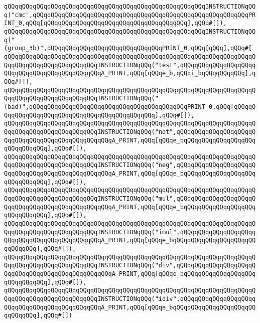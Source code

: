 \verb|qQQqqQQqqQQqqQQqqQQqqQQqqQQqqQQqqQQqqQQqqQQqqQQqqQQqqQQqINSTRUCTIONqQQq("cmc",qQQqqQQqqQQqqQQqqQQqqQQqqQQqqQQqqQQqqQQqqQQqqQQqqQQqqQQqqQQqPRINT_0,qQQq[qQQqqQQqqQQqqQQqqQQqqQQqqQQqqQQqqQQqqQQq],qQQq#[]),|\newline
\verb|qQQqqQQqqQQqqQQqqQQqqQQqqQQqqQQqqQQqqQQqqQQqqQQqqQQqqQQqINSTRUCTIONqQQq("(group_3b)",qQQqqQQqqQQqqQQqqQQqqQQqqQQqqQQqPRINT_0,qQQq[qQQq],qQQq#[|\newline
\verb|qQQqqQQqqQQqqQQqqQQqqQQqqQQqqQQqqQQqqQQqqQQqqQQqqQQqqQQqqQQqqQQqqQQqqQQqqQQqqQQqqQQqqQQqqQQqqQQqINSTRUCTIONqQQq("test",qQQqqQQqqQQqqQQqqQQqqQQqqQQqqQQqqQQqqQQqqQQqqQQqA_PRINT,qQQq[qQQqe_b,qQQqi_bqQQqqQQqqQQq],qQQq#[]),|\newline
\verb|qQQqqQQqqQQqqQQqqQQqqQQqqQQqqQQqqQQqqQQqqQQqqQQqqQQqqQQqqQQqqQQqqQQqqQQqqQQqqQQqqQQqqQQqqQQqqQQqINSTRUCTIONqQQq("(bad)",qQQqqQQqqQQqqQQqqQQqqQQqqQQqqQQqqQQqqQQqqQQqPRINT_0,qQQq[qQQqqQQqqQQqqQQqqQQqqQQqqQQqqQQqqQQqqQQqqQQqqQQq],qQQq#[]),|\newline
\verb|qQQqqQQqqQQqqQQqqQQqqQQqqQQqqQQqqQQqqQQqqQQqqQQqqQQqqQQqqQQqqQQqqQQqqQQqqQQqqQQqqQQqqQQqqQQqqQQqINSTRUCTIONqQQq("not",qQQqqQQqqQQqqQQqqQQqqQQqqQQqqQQqqQQqqQQqqQQqqQQqqQQqA_PRINT,qQQq[qQQqe_bqQQqqQQqqQQqqQQqqQQqqQQqqQQqqQQq],qQQq#[]),|\newline
\verb|qQQqqQQqqQQqqQQqqQQqqQQqqQQqqQQqqQQqqQQqqQQqqQQqqQQqqQQqqQQqqQQqqQQqqQQqqQQqqQQqqQQqqQQqqQQqqQQqINSTRUCTIONqQQq("neg",qQQqqQQqqQQqqQQqqQQqqQQqqQQqqQQqqQQqqQQqqQQqqQQqqQQqA_PRINT,qQQq[qQQqe_bqQQqqQQqqQQqqQQqqQQqqQQqqQQqqQQq],qQQq#[]),|\newline
\verb|qQQqqQQqqQQqqQQqqQQqqQQqqQQqqQQqqQQqqQQqqQQqqQQqqQQqqQQqqQQqqQQqqQQqqQQqqQQqqQQqqQQqqQQqqQQqqQQqINSTRUCTIONqQQq("mul",qQQqqQQqqQQqqQQqqQQqqQQqqQQqqQQqqQQqqQQqqQQqqQQqqQQqA_PRINT,qQQq[qQQqe_bqQQqqQQqqQQqqQQqqQQqqQQqqQQqqQQq],qQQq#[]),|\newline
\verb|qQQqqQQqqQQqqQQqqQQqqQQqqQQqqQQqqQQqqQQqqQQqqQQqqQQqqQQqqQQqqQQqqQQqqQQqqQQqqQQqqQQqqQQqqQQqqQQqINSTRUCTIONqQQq("imul",qQQqqQQqqQQqqQQqqQQqqQQqqQQqqQQqqQQqqQQqqQQqqQQqA_PRINT,qQQq[qQQqe_bqQQqqQQqqQQqqQQqqQQqqQQqqQQqqQQq],qQQq#[]),|\newline
\verb|qQQqqQQqqQQqqQQqqQQqqQQqqQQqqQQqqQQqqQQqqQQqqQQqqQQqqQQqqQQqqQQqqQQqqQQqqQQqqQQqqQQqqQQqqQQqqQQqINSTRUCTIONqQQq("div",qQQqqQQqqQQqqQQqqQQqqQQqqQQqqQQqqQQqqQQqqQQqqQQqqQQqA_PRINT,qQQq[qQQqe_bqQQqqQQqqQQqqQQqqQQqqQQqqQQqqQQq],qQQq#[]),|\newline
\verb|qQQqqQQqqQQqqQQqqQQqqQQqqQQqqQQqqQQqqQQqqQQqqQQqqQQqqQQqqQQqqQQqqQQqqQQqqQQqqQQqqQQqqQQqqQQqqQQqINSTRUCTIONqQQq("idiv",qQQqqQQqqQQqqQQqqQQqqQQqqQQqqQQqqQQqqQQqqQQqqQQqA_PRINT,qQQq[qQQqe_bqQQqqQQqqQQqqQQqqQQqqQQqqQQqqQQq],qQQq#[])|\newline
